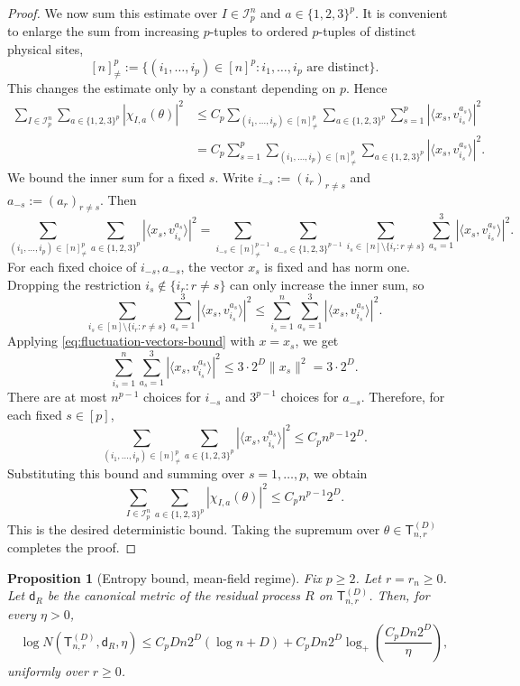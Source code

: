 \documentclass[12pt]{article}
\newtheorem{proposition}[theorem]{Proposition}
\newcommand{\mcI}{\mathcal{I}}
\begin{document}
\begin{proof}
We now sum this estimate over \(I\in\mcI_p^n\) and
\(a\in\{1,2,3\}^p\). It is convenient to enlarge the sum from increasing
$p$-tuples to ordered $p$-tuples of distinct physical sites,
\[
    [n]^p_{\neq}
    :=
    \{(i_1,\dots,i_p)\in[n]^p:
    i_1,\dots,i_p \text{ are distinct}\}.
\]
This changes the estimate only by a constant depending on $p$. Hence
\[
\begin{aligned}
\sum_{I\in\mcI_p^n}
\sum_{a\in\{1,2,3\}^p}
|\chi_{I,a}(\theta)|^2
&\le
C_p
\sum_{(i_1,\dots,i_p)\in[n]^p_{\neq}}
\sum_{a\in\{1,2,3\}^p}
\sum_{s=1}^p
|\langle x_s,v_{i_s}^{a_s}\rangle|^2  \\
&=
C_p
\sum_{s=1}^p
\sum_{(i_1,\dots,i_p)\in[n]^p_{\neq}}
\sum_{a\in\{1,2,3\}^p}
|\langle x_s,v_{i_s}^{a_s}\rangle|^2 .
\end{aligned}
\]
We bound the inner sum for a fixed \(s\). Write
    $i_{-s}:=(i_r)_{r\neq s}$ and $
    a_{-s}:=(a_r)_{r\neq s}$. Then
\[
\sum_{(i_1,\dots,i_p)\in[n]^p_{\neq}}
\sum_{a\in\{1,2,3\}^p}
|\langle x_s,v_{i_s}^{a_s}\rangle|^2  =
\sum_{i_{-s}\in[n]^{p-1}_{\neq}}
\sum_{a_{-s}\in\{1,2,3\}^{p-1}}
\sum_{i_s\in[n]\setminus\{i_r:r\neq s\}}
\sum_{a_s=1}^3
|\langle x_s,v_{i_s}^{a_s}\rangle|^2 .
\]
For each fixed choice of \(i_{-s},a_{-s}\), the vector $x_s$ is fixed and has norm one. Dropping the restriction
\(i_s\notin\{i_r:r\neq s\}\) can only increase the inner sum, so
\[
\sum_{i_s\in[n]\setminus\{i_r:r\neq s\}}
\sum_{a_s=1}^3
|\langle x_s,v_{i_s}^{a_s}\rangle|^2
\le
\sum_{i_s=1}^n
\sum_{a_s=1}^3
|\langle x_s,v_{i_s}^{a_s}\rangle|^2 .
\]
Applying \eqref{eq:fluctuation-vectors-bound} with \(x=x_s\), we get
\[
\sum_{i_s=1}^n
\sum_{a_s=1}^3
|\langle x_s,v_{i_s}^{a_s}\rangle|^2
\le
3\cdot 2^D\|x_s\|^2
=
3\cdot 2^D .
\]
There are at most \(n^{p-1}\) choices for \(i_{-s}\) and \(3^{p-1}\) choices
for \(a_{-s}\). Therefore, for each fixed \(s\in[p]\),
\[
\sum_{(i_1,\dots,i_p)\in[n]^p_{\neq}}
\sum_{a\in\{1,2,3\}^p}
|\langle x_s,v_{i_s}^{a_s}\rangle|^2
\le
C_p n^{p-1}2^D .
\]
Substituting this bound and summing over \(s=1,\dots,p\), we obtain
\[
\sum_{I\in\mcI_p^n}
\sum_{a\in\{1,2,3\}^p}
|\chi_{I,a}(\theta)|^2
\le
C_p n^{p-1}2^D .
\]
This is the desired deterministic bound. Taking the supremum over
\(\theta\in\mathsf{T}_{n,r}^{(D)}\) completes the proof.

\end{proof}


\begin{proposition}[Entropy bound, mean-field regime]
\label{prop:full-residual-entropy}
Fix \(p\ge2\). Let \(r=r_n\ge0\). Let \(\mathsf{d}_{R}\) be the canonical metric of the residual process
$R$ on \(\mathsf{T}_{n,r}^{(D)}\). Then, for every \(\eta>0\),
\[
\log N(\mathsf{T}_{n,r}^{(D)},\mathsf{d}_{R},\eta)
\le
C_pDn2^D(\log n+D)
+
C_pDn2^D
\log_+\left(\frac{C_pDn2^D}{\eta}\right),
\]
uniformly over \(r\ge0\).
\end{proposition}
\end{document}
